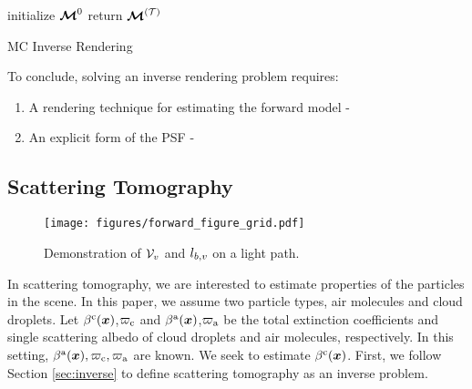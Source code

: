 \documentclass{article}
\begin{document}
\begin{algorithm}
\DontPrintSemicolon
\SetAlgoLined
 initialize $\boldsymbol{\mathcal{M}}^{0}$\;
return $\boldsymbol{\mathcal{M}}^{\left({\mathcal{T}}\right)}$

 \caption{\ac{MC} Inverse Rendering}
 \label{alg:inverse_rendering}
\end{algorithm}
To conclude, solving an inverse rendering problem requires:
\begin{enumerate}
    \item A rendering technique for estimating the forward model - \eq{\ref{eq:forward_simualtion}}
    \item An explicit form of the \ac{PSF} - \eq{\ref{eq:total_derivative_factor}}
\end{enumerate}
\subsection{Scattering Tomography}
\begin{figure}[b]
  \centering
  \texttt{[image: figures/forward\_figure\_grid.pdf]}
    \caption{Demonstration of $\mathcal{V}_{v}$ and $l_{b,v}$ on a light path.}
    \label{fig:inverse_notations}
\end{figure}
In scattering tomography, we are interested to estimate properties of the particles in the scene. In this paper, we assume two  particle types, air molecules and cloud droplets. Let $\beta^{\text{c}}(\boldsymbol{x})$,$\varpi_{\text{c}}$ and $\beta^{\text{a}}(\boldsymbol{x})$,$\varpi_{\text{a}}$ be the total extinction coefficients and single scattering albedo of cloud droplets and air molecules, respectively. In this setting, $\beta^{\text{a}}(\boldsymbol{x}), \varpi_{\text{c}}, \varpi_{\text{a}}$ are known. We seek to estimate $\beta^{\text{c}}(\boldsymbol{x})$. First, we follow Section \ref{sec:inverse} to define scattering tomography as an inverse problem. 
\end{document}
